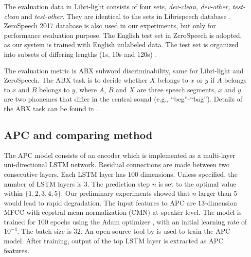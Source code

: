 \documentclass[a4paper]{article}
\newcommand{\quotes}[1]{``#1''}
\begin{document}
The evaluation data in Libri-light consists of four sets, \textit{dev-clean, dev-other, test-clean} and \textit{test-other}. 
They are identical to the sets in Librispeech database \cite{panayotov2015librispeech}.
ZeroSpeech 2017 database is also used in our experiments, but only for performance evaluation purpose. The English test set in ZeroSpeech is adopted, as our system is trained with English unlabeled data. 
The test set is organized into subsets of differing   lengths (1s, 10s and 120s)  \cite{dunbar2017zero}.


The evaluation metric is  ABX subword discriminability, same for    Libri-light and ZeroSpeech.
The ABX task is to decide whether $X$ belongs to $x$ or $y$ if $A$ belongs to $x$ and $B$ belongs to $y$, where $A$, $B$ and $X$ are three speech segments, $x$ and $y$ are two phonemes that differ in the central sound (e.g., \quotes{beg}-\quotes{bag}). Details of the ABX task can be found in \cite{dunbar2017zero}. 
\subsection{APC and comparing method}
The APC model consists of an encoder which is implemented as a  multi-layer uni-directional LSTM network. Residual connections are made between two consecutive layers.  
Each LSTM layer has $100$ dimensions.
Unless specified, the number of LSTM layers is $3$.
The prediction step $n$ is set to  the optimal value within $\{1,2,3,4,5\}$. Our preliminary experiments showed that $n$ larger than $5$ would lead to rapid degradation. 
The input features to APC are $13$-dimension MFCC with cepstral mean normalization (CMN) at speaker level. 
The model is trained for $100$ epochs using the Adam optimizer \cite{kingma2014adam}, with an initial learning rate of $10^{-4}$. The batch size is  $32$. An open-source tool by \cite{Chung2019} is used to train the APC model. 
After training, output of the top LSTM layer is extracted as APC features.
\end{document}
